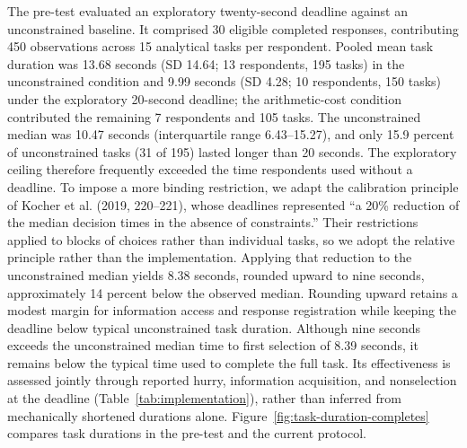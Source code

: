 \documentclass[11pt]{article}\usepackage[]{graphicx}\usepackage[]{xcolor}
\begin{document}
The pre-test evaluated an exploratory twenty-second deadline against an unconstrained baseline. It comprised 30 eligible completed responses, contributing 450 observations across 15 analytical tasks per respondent. Pooled mean task duration was 13.68 seconds (SD 14.64; 13 respondents, 195 tasks) in the unconstrained condition and 9.99 seconds (SD 4.28; 10 respondents, 150 tasks) under the exploratory 20-second deadline; the arithmetic-cost condition contributed the remaining 7 respondents and 105 tasks. The unconstrained median was 10.47 seconds (interquartile range 6.43--15.27), and only 15.9 percent of unconstrained tasks (31 of 195) lasted longer than 20 seconds. The exploratory ceiling therefore frequently exceeded the time respondents used without a deadline. To impose a more binding restriction, we adapt the calibration principle of Kocher et al. (2019, 220--221), whose deadlines represented ``a 20\% reduction of the median decision times in the absence of constraints.'' Their restrictions applied to blocks of choices rather than individual tasks, so we adopt the relative principle rather than the implementation. Applying that reduction to the unconstrained median yields 8.38 seconds, rounded upward to nine seconds, approximately 14 percent below the observed median. Rounding upward retains a modest margin for information access and response registration while keeping the deadline below typical unconstrained task duration. Although nine seconds exceeds the unconstrained median time to first selection of 8.39 seconds, it remains below the typical time used to complete the full task. Its effectiveness is assessed jointly through reported hurry, information acquisition, and nonselection at the deadline (Table~\ref{tab:implementation}), rather than inferred from mechanically shortened durations alone. Figure~\ref{fig:task-duration-completes} compares task durations in the pre-test and the current protocol.
\end{document}
